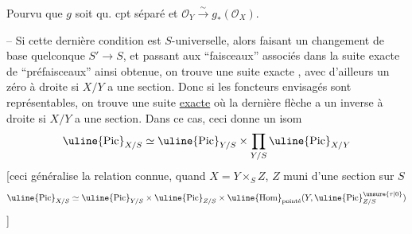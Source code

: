 


Pourvu que $g$ soit qu. cpt séparé et $\mathcal O_Y\overset{\sim}{\longrightarrow}g_*(\mathcal O_X)$.

-- Si cette dernière condition est $S$-universelle, alors  faisant un changement de base quelconque $S'\longrightarrow S$, et passant aux ``faisceaux'' associés dans la suite exacte de  ``préfaisceaux'' ainsi obtenue, on trouve une suite exacte
,
avec d'ailleurs un zéro à droite  si $X/Y$ a une section. Donc si les foncteurs envisagés sont représentables, on trouve une suite \uline{exacte}
où la dernière flèche a un inverse à droite si $X/Y$ a une section. Dans ce cas, ceci donne un isom
\[
\uline{\operatorname{Pic}}_{X/S}\simeq\uline{\operatorname{Pic}}_{Y/S}\times\prod_{Y/S}\uline{\operatorname{Pic}}_{X/Y}
\]
[ceci généralise la relation connue, quand $X=Y\times_S Z$, $Z$ muni d'une section sur $S$
\[
\uline{\operatorname{Pic}}_{X/S}\simeq\uline{\operatorname{Pic}}_{Y/S}\times\uline{\operatorname{Pic}}_{Z/S}\times\uline{\operatorname{Hom}}_{\text{pointé}}(Y,\uline{\operatorname{Pic}}^{\unsure{\tau|0}}_{Z/S})
\]
]
